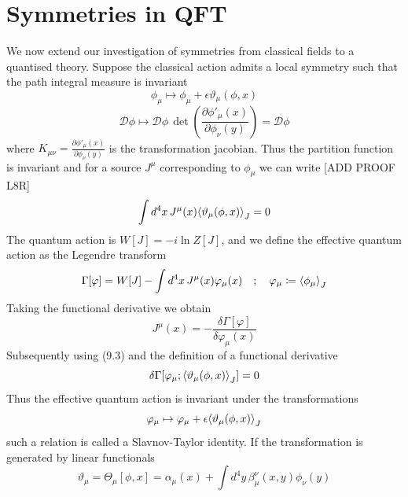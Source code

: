 \documentclass[11pt, a4paper]{article}
\theoremstyle{definition}
\theoremstyle{plain}
\begin{document}
\section{Symmetries in QFT}

We now extend our investigation of symmetries from classical fields to a
quantised theory. Suppose the classical action admits a local symmetry
such that the path integral measure is invariant
\begin{equation}
  \phi_\mu \mapsto \phi_\mu + \epsilon\vartheta_\mu(\phi, x)
\end{equation}
\begin{equation}
  \mathcal{D}\phi \mapsto
  \mathcal{D}\phi\,\det\!{\left(\frac{\partial \phi'_{\mu}(x)}{\partial \phi_\nu(y)}\right)}
  = \mathcal{D}\phi
\end{equation}
where $K_{\mu\nu} = \frac{\partial \phi'_{\mu}(x)}{\partial \phi_\nu(y)}$ is the 
transformation jacobian. Thus the partition function is invariant
and for a source $J^\mu$ corresponding to $\phi_\mu$ we can write [ADD PROOF L8R]
\begin{equation}
  \int{d^4x\,J^\mu(x)\!\braket{\vartheta_\mu(\phi, x)}}_J = 0
\end{equation}
The quantum action is $W[J] = -i\ln{Z[J]}$, and 
we define the effective quantum action as the Legendre transform
\begin{equation}
  \Gamma[\varphi] = W[J] - \int{d^4x\,J^\mu(x)\varphi_\mu(x)} \quad; 
  \quad \varphi_\mu \coloneq \braket{\phi_\mu}_J
\end{equation}
Taking the functional derivative we obtain
\begin{equation}
  J^\mu(x) = - \frac{\delta \Gamma[\varphi]}{\delta \varphi_\mu(x)}
\end{equation}
Subsequently using (9.3) and the definition of a functional derivative 
\begin{equation}
  \delta\Gamma[\varphi_\mu;\braket{\vartheta_\mu(\phi, x)}_J] = 0
\end{equation}
Thus the effective quantum action is invariant under the transformations
\begin{equation}
  \varphi_\mu \mapsto \varphi_\mu + \epsilon\!\braket{\vartheta_\mu(\phi, x)}_J 
\end{equation}
such a relation is called a Slavnov-Taylor identity.
If the transformation is generated by linear functionals
\begin{equation}
  \vartheta_\mu = \Theta_\mu[\phi, x] = \alpha_\mu(x) +
  \int{d^4y\,\beta^\nu_\mu(x, y)\phi_\nu(y) }
\end{equation}
\end{document}
